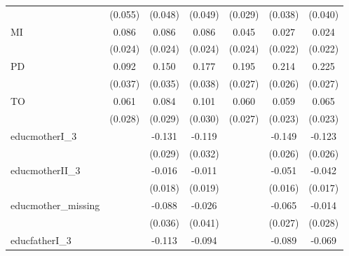 \begin{table}[htbp]
\begin{tabular}{l*{6}{c}}
                    &     (0.055)         &     (0.048)         &     (0.049)         &     (0.029)         &     (0.038)         &     (0.040)         \\
MI                  &       0.086\sym{***}&       0.086\sym{***}&       0.086\sym{***}&       0.045\sym{*}  &       0.027         &       0.024         \\
                    &     (0.024)         &     (0.024)         &     (0.024)         &     (0.024)         &     (0.022)         &     (0.022)         \\
PD                  &       0.092\sym{**} &       0.150\sym{***}&       0.177\sym{***}&       0.195\sym{***}&       0.214\sym{***}&       0.225\sym{***}\\
                    &     (0.037)         &     (0.035)         &     (0.038)         &     (0.027)         &     (0.026)         &     (0.027)         \\
TO                  &       0.061\sym{**} &       0.084\sym{***}&       0.101\sym{***}&       0.060\sym{**} &       0.059\sym{**} &       0.065\sym{***}\\
                    &     (0.028)         &     (0.029)         &     (0.030)         &     (0.027)         &     (0.023)         &     (0.023)         \\
educmotherI\_3       &                     &      -0.131\sym{***}&      -0.119\sym{***}&                     &      -0.149\sym{***}&      -0.123\sym{***}\\
                    &                     &     (0.029)         &     (0.032)         &                     &     (0.026)         &     (0.026)         \\
educmotherII\_3      &                     &      -0.016         &      -0.011         &                     &      -0.051\sym{***}&      -0.042\sym{**} \\
                    &                     &     (0.018)         &     (0.019)         &                     &     (0.016)         &     (0.017)         \\
educmother\_missing  &                     &      -0.088\sym{**} &      -0.026         &                     &      -0.065\sym{**} &      -0.014         \\
                    &                     &     (0.036)         &     (0.041)         &                     &     (0.027)         &     (0.028)         \\
educfatherI\_3       &                     &      -0.113\sym{***}&      -0.094\sym{***}&                     &      -0.089\sym{***}&      -0.069\sym{***}\\

\end{tabular}
\end{table}
